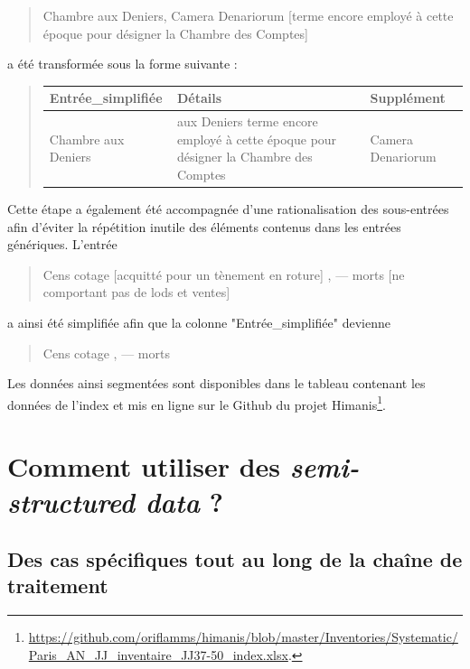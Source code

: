 \documentclass[a4paper,12pt,twoside]{book}
\begin{document}
	\begin{quotation}
		Chambre aux Deniers, Camera Denariorum [terme encore employé à cette époque pour 	désigner la Chambre des Comptes]
	\end{quotation}

	\noindent a été transformée sous la forme suivante :

	\begin{quotation}
		\begin{tabular}{|p{4cm}|p{4cm}|p{4cm}|}
			\hline
			Entrée\_simplifiée & Détails & Supplément \\ \hline
			Chambre aux Deniers & aux Deniers	terme encore employé à cette époque pour désigner la Chambre des Comptes & Camera Denariorum \\ \hline
		\end{tabular}
	\end{quotation}
	
	\noindent Cette étape a également été accompagnée d'une rationalisation des sous-entrées afin d'éviter la répétition inutile des éléments contenus dans les entrées génériques. L'entrée
	
	\begin{quotation}
		Cens cotage [acquitté pour un tènement en roture] , — morts [ne comportant pas de lods et ventes]
	\end{quotation}

	\noindent a ainsi été simplifiée afin que la colonne "Entrée\_simplifiée" devienne
	
	\begin{quotation}
		Cens cotage , — morts
	\end{quotation}

	\noindent Les données ainsi segmentées sont disponibles dans le tableau contenant les données de l'index et mis en ligne sur le Github du projet Himanis\footnote{\url{https://github.com/oriflamms/himanis/blob/master/Inventories/Systematic/Paris_AN_JJ_inventaire_JJ37-50_index.xlsx}.}.
	
	\section{Comment utiliser des \textit{semi-structured data} ?}
	
	\subsection{Des cas spécifiques tout au long de la chaîne de traitement}
	
\end{document}
